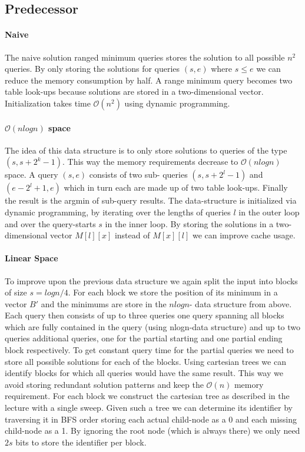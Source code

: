 \documentclass[a4paper,UKenglish,cleveref, autoref, thm-restate]{lipics-v2021}
\begin{document}
\subsection{Predecessor}
\paragraph*{Naive} The naive solution ranged minimum queries stores the solution to all possible $n^2$ queries. By only 
storing the solutions for queries $(s,e)$ where $s \leq e$ we can reduce the memory consumption by half. A 
range minimum query becomes two table look-ups because solutions are stored in a two-dimensional vector. 
Initialization takes time $\mathcal{O}(n^2)$ using dynamic programming.

\paragraph*{$\mathcal{O}(nlogn)$ space} The idea of this data structure is to only store solutions to queries of the type $(s, s+2^k-1)$. This way 
the memory requirements decrease to $\mathcal{O}(nlogn)$ space. A query $(s, e)$ consists of two sub-
queries $(s, s+2^l-1)$ and $(e-2^l+1, e)$ which in turn each are made up of two table look-ups. Finally the 
result is the argmin of sub-query results. The data-structure is initialized via dynamic programming, by 
iterating over the lengths of queries $l$ in the outer loop and over the query-starts $s$ in the inner 
loop. By storing the solutions in a two-dimensional vector $M[l][x]$ instead of $M[x][l]$ we can improve 
cache usage.

\paragraph*{Linear Space} To improve upon the previous data structure we again split the input into blocks of size $s = logn/4$. For 
each block we store the position of its minimum in a vector $B'$ and the minimums are store in the $nlogn$-
data structure from above. Each query then consists of up to three queries one query spanning all blocks 
which are fully contained in the query (using nlogn-data structure) and up to two queries additional 
queries, one for the partial starting and one partial ending block respectively. To get constant query time 
for the partial queries we need to store all possible solutions for each of the blocks. Using cartesian 
trees we can identify blocks for which all queries would have the same result. This way we avoid storing 
redundant solution patterns and keep the $\mathcal{O}(n)$ memory requirement. For each block we construct 
the cartesian tree as described in the lecture with a single sweep. Given such a tree we can determine its 
identifier by traversing it in BFS order storing each actual child-node as a 0 and each missing child-node 
as a 1. By ignoring the root node (which is always there) we only need $2s$ bits to store the identifier 
per block.
\end{document}
